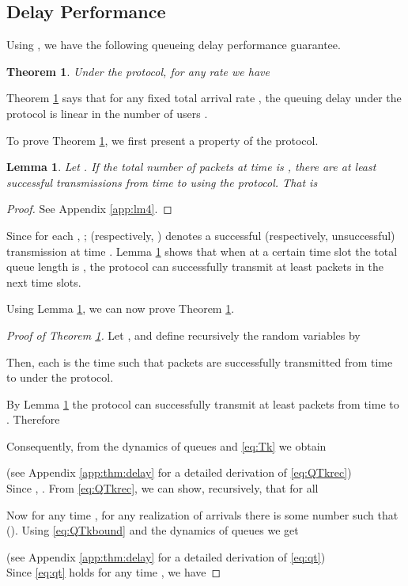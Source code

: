\documentclass[onecolumn,draftcls]{IEEEtran}
\newtheorem{theorem}{Theorem}
\newtheorem{lemma}{Lemma}
\begin{document}
\subsection{Delay Performance} \label{sub:delay}

Using , we have the following queueing delay performance guarantee.
\begin{theorem}
\label{thm:delay}
Under the  protocol, for any rate  we have

\end{theorem}

Theorem \ref{thm:delay} says that for any fixed total arrival rate , the queuing delay under the  protocol is linear in the number of users . 

To prove Theorem \ref{thm:delay}, we first present a property of the  protocol.
\begin{lemma}
\label{lm:successfulq}
Let .
If the total number of packets at time  is , there are at least  successful transmissions from time  to  using the  protocol. That is




\end{lemma}
\begin{proof}
See Appendix \ref{app:lm4}.
\end{proof}

Since  for each , ;  (respectively, ) denotes a successful (respectively, unsuccessful) transmission at time .
Lemma \ref{lm:successfulq} shows that when at a certain time slot the total queue length is ,
the  protocol can successfully transmit at least  packets in the next  time slots.


Using Lemma \ref{lm:successfulq}, we can now prove Theorem \ref{thm:delay}.

\begin{proof}[Proof of Theorem \ref{thm:delay}]
Let , and define recursively the random variables  by

Then, each  is the time such that  packets are successfully transmitted
from time  to  under the  protocol.


By Lemma \ref{lm:successfulq} the  protocol can successfully transmit at least  packets from time
 to . Therefore

Consequently, from the dynamics of queues and \eqref{eq:Tk} we obtain

(see Appendix \ref{app:thm:delay} for a detailed derivation of \eqref{eq:QTkrec})
\\
Since , .
From \eqref{eq:QTkrec}, we can show, recursively, that for all 

Now for any time , for any realization of arrivals there is some number  such that  (). Using \eqref{eq:QTkbound} and the dynamics of queues we get

(see Appendix \ref{app:thm:delay} for a detailed derivation of \eqref{eq:qt})
\\
Since \eqref{eq:qt} holds for any time , we have


\end{proof}
\end{document}
